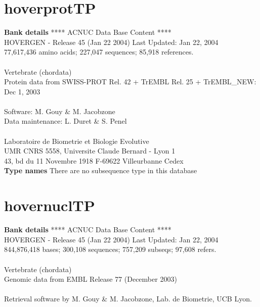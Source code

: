 \documentclass{article}
\begin{document}
\begin{Schunk}
\section{ hoverprotTP }
\textbf{Bank details}
               ****     ACNUC Data Base Content      ****                       \\
         HOVERGEN - Release 45 (Jan 22 2004) Last Updated: Jan 22, 2004\\
          77,617,436 amino acids; 227,047 sequences; 85,918 references.\\
\\
                       Vertebrate (chordata)	  \\
Protein data from SWISS-PROT Rel. 42  + TrEMBL Rel. 25 + TrEMBL\_NEW: Dec 1, 2003\\
\\
Software: M. Gouy \& M. Jacobzone\\
Data maintenance: L. Duret \& S. Penel\\
\\
Laboratoire de Biometrie et Biologie Evolutive\\
UMR CNRS 5558, Universite Claude Bernard - Lyon 1 \\
43, bd du 11 Novembre 1918 F-69622 Villeurbanne Cedex\\


\textbf{Type names}
There are no subsequence type in this database
\section{ hovernuclTP }
\textbf{Bank details}
               ****     ACNUC Data Base Content      ****                      \\
         HOVERGEN - Release 45 (Jan 22 2004) Last Updated: Jan 22, 2004\\
844,876,418 bases; 300,108 sequences; 757,209 subseqs; 97,608 refers.\\
                                                                               \\
                       Vertebrate (chordata)\\
             Genomic data from EMBL Release 77  (December 2003)\\
\\
Retrieval software by M. Gouy \& M. Jacobzone, Lab. de Biometrie, UCB Lyon.


\end{Schunk}
\end{document}
